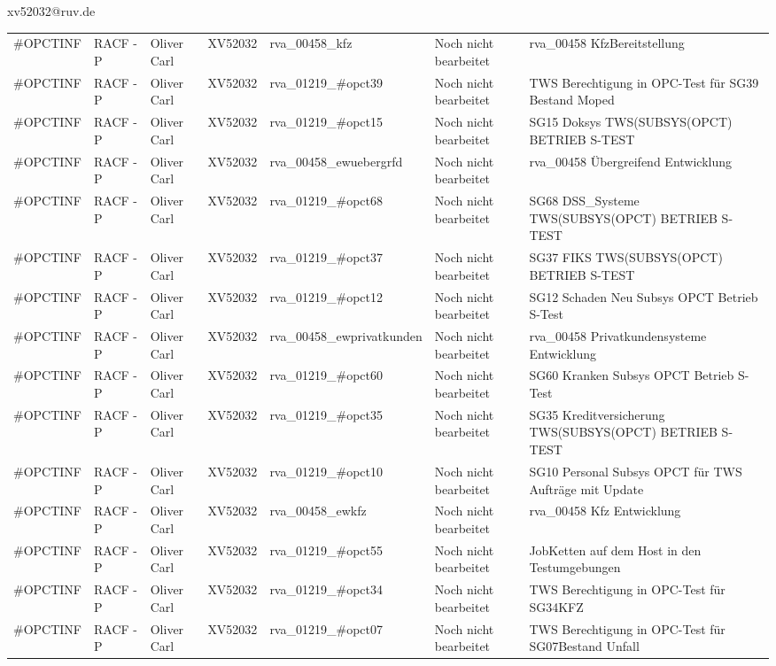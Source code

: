 \documentclass[a4paper,landscape,12pt]{letter}
\begin{document}
\begin{letter}{xv52032@ruv.de\hfill \break}
\begin{tiny}
\begin{longtable}{|p{35mm}|p{15mm}|p{25mm}|p{10mm}|p{40mm}|p{50mm}|p{50mm}|}
\#OPCTINF & RACF - P & Oliver Carl & XV52032 & rva\_00458\_kfz & Noch nicht bearbeitet & rva\_00458 KfzBereitstellung \\
\#OPCTINF & RACF - P & Oliver Carl & XV52032 & rva\_01219\_\#opct39 & Noch nicht bearbeitet & TWS Berechtigung in OPC-Test für SG39 Bestand Moped \\
\#OPCTINF & RACF - P & Oliver Carl & XV52032 & rva\_01219\_\#opct15 & Noch nicht bearbeitet & SG15 Doksys TWS(SUBSYS(OPCT) BETRIEB S-TEST \\
\#OPCTINF & RACF - P & Oliver Carl & XV52032 & rva\_00458\_ewuebergrfd & Noch nicht bearbeitet & rva\_00458 Übergreifend Entwicklung \\
\#OPCTINF & RACF - P & Oliver Carl & XV52032 & rva\_01219\_\#opct68 & Noch nicht bearbeitet & SG68 DSS\_Systeme TWS(SUBSYS(OPCT) BETRIEB S-TEST \\
\#OPCTINF & RACF - P & Oliver Carl & XV52032 & rva\_01219\_\#opct37 & Noch nicht bearbeitet & SG37 FIKS TWS(SUBSYS(OPCT) BETRIEB S-TEST \\
\#OPCTINF & RACF - P & Oliver Carl & XV52032 & rva\_01219\_\#opct12 & Noch nicht bearbeitet & SG12 Schaden Neu Subsys OPCT Betrieb S-Test \\
\#OPCTINF & RACF - P & Oliver Carl & XV52032 & rva\_00458\_ewprivatkunden & Noch nicht bearbeitet & rva\_00458 Privatkundensysteme Entwicklung \\
\#OPCTINF & RACF - P & Oliver Carl & XV52032 & rva\_01219\_\#opct60 & Noch nicht bearbeitet & SG60 Kranken Subsys OPCT Betrieb S-Test \\
\#OPCTINF & RACF - P & Oliver Carl & XV52032 & rva\_01219\_\#opct35 & Noch nicht bearbeitet & SG35 Kreditversicherung TWS(SUBSYS(OPCT) BETRIEB S-TEST \\
\#OPCTINF & RACF - P & Oliver Carl & XV52032 & rva\_01219\_\#opct10 & Noch nicht bearbeitet & SG10 Personal Subsys OPCT für TWS Aufträge mit Update \\
\#OPCTINF & RACF - P & Oliver Carl & XV52032 & rva\_00458\_ewkfz & Noch nicht bearbeitet & rva\_00458 Kfz Entwicklung \\
\#OPCTINF & RACF - P & Oliver Carl & XV52032 & rva\_01219\_\#opct55 & Noch nicht bearbeitet & JobKetten auf dem Host in den Testumgebungen \\
\#OPCTINF & RACF - P & Oliver Carl & XV52032 & rva\_01219\_\#opct34 & Noch nicht bearbeitet & TWS Berechtigung in OPC-Test für SG34KFZ \\
\#OPCTINF & RACF - P & Oliver Carl & XV52032 & rva\_01219\_\#opct07 & Noch nicht bearbeitet & TWS Berechtigung in OPC-Test für SG07Bestand Unfall \\

\end{longtable}
\end{tiny}
\end{letter}
\end{document}
